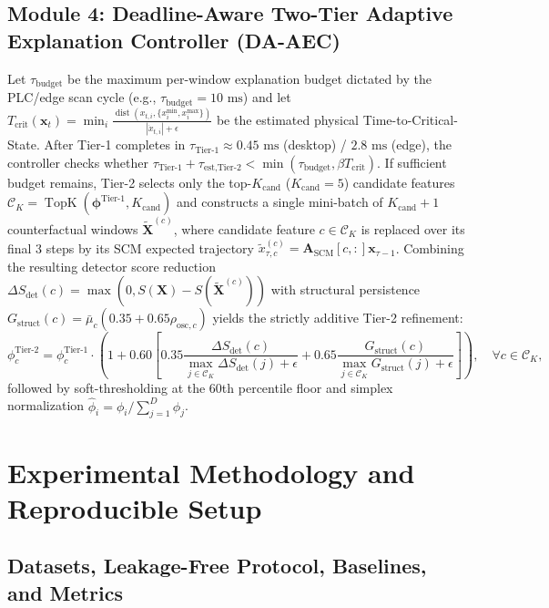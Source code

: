 \documentclass[10pt,a4paper]{article}
\begin{document}
\subsection{Module 4: Deadline-Aware Two-Tier Adaptive Explanation Controller (DA-AEC)}

Let $\tau_{\text{budget}}$ be the maximum per-window explanation budget dictated by the PLC/edge scan cycle (e.g., $\tau_{\text{budget}} = 10\text{ ms}$) and let $T_{\text{crit}}(\mathbf{x}_t) = \min_{i} \frac{\operatorname{dist}(x_{t,i}, \{x_i^{\min}, x_i^{\max}\})}{|\dot{x}_{t,i}| + \epsilon}$ be the estimated physical Time-to-Critical-State. After Tier-1 completes in $\tau_{\text{Tier-1}} \approx 0.45\text{ ms}$ (desktop) / $2.8\text{ ms}$ (edge), the controller checks whether $\tau_{\text{Tier-1}} + \tau_{\text{est,Tier-2}} < \min(\tau_{\text{budget}}, \beta T_{\text{crit}})$. If sufficient budget remains, Tier-2 selects only the top-$K_{\text{cand}}$ ($K_{\text{cand}} = 5$) candidate features $\mathcal{C}_K = \operatorname{TopK}(\boldsymbol{\phi}^{\text{Tier-1}}, K_{\text{cand}})$ and constructs a single mini-batch of $K_{\text{cand}} + 1$ counterfactual windows $\tilde{\mathbf{X}}^{(c)}$, where candidate feature $c \in \mathcal{C}_K$ is replaced over its final 3 steps by its SCM expected trajectory $\tilde{x}_{\tau,c}^{(c)} = \mathbf{A}_{\text{SCM}}[c, :] \mathbf{x}_{\tau-1}$. Combining the resulting detector score reduction $\Delta S_{\text{det}}(c) = \max(0, S(\mathbf{X}) - S(\tilde{\mathbf{X}}^{(c)}))$ with structural persistence $G_{\text{struct}}(c) = \bar{\mu}_c(0.35 + 0.65\rho_{\text{osc},c})$ yields the strictly additive Tier-2 refinement:
\begin{equation}\label{eq:tier2}
    \phi_c^{\text{Tier-2}} = \phi_c^{\text{Tier-1}} \cdot \left(1 + 0.60 \left[0.35 \frac{\Delta S_{\text{det}}(c)}{\max_{j \in \mathcal{C}_K} \Delta S_{\text{det}}(j) + \epsilon} + 0.65 \frac{G_{\text{struct}}(c)}{\max_{j \in \mathcal{C}_K} G_{\text{struct}}(j) + \epsilon}\right]\right), \quad \forall c \in \mathcal{C}_K,
\end{equation}
followed by soft-thresholding at the 60th percentile floor and simplex normalization $\hat{\phi}_i = \phi_i / \sum_{j=1}^D \phi_j$.

\section{Experimental Methodology and Reproducible Setup}

\subsection{Datasets, Leakage-Free Protocol, Baselines, and Metrics}
\end{document}
